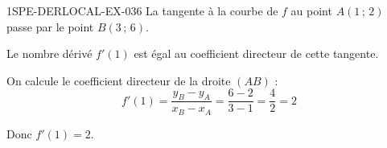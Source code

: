 \begin{corrige}{1SPE-DERLOCAL-EX-036}
La tangente à la courbe de $f$ au point $A(1\,;\,2)$ passe par le point $B(3\,;\,6)$.

Le nombre dérivé $f'(1)$ est égal au coefficient directeur de cette tangente.

On calcule le coefficient directeur de la droite $(AB)$ :
\[
f'(1) = \frac{y_B - y_A}{x_B - x_A} = \frac{6 - 2}{3 - 1} = \frac{4}{2} = \boxed{2}
\]

Donc $f'(1) = 2$.
\end{corrige}
